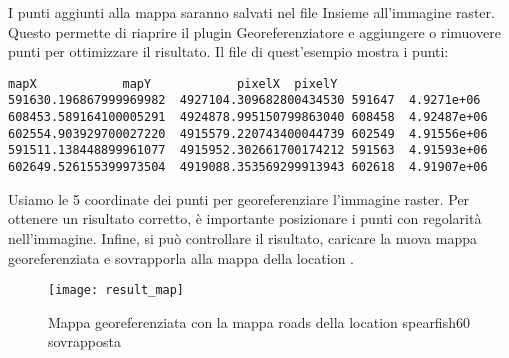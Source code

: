 I punti aggiunti alla mappa saranno salvati nel file  Insieme all'immagine raster. Questo permette di riaprire il plugin Georeferenziatore e aggiungere o rimuovere punti per ottimizzare il risultato. Il file  di quest'esempio mostra i punti:

\begin{verbatim}
mapX    		mapY    		pixelX  pixelY
591630.196867999969982  4927104.309682800434530 591647  4.9271e+06
608453.589164100005291  4924878.995150799863040 608458  4.92487e+06
602554.903929700027220  4915579.220743400044739 602549  4.91556e+06
591511.138448899961077  4915952.302661700174212 591563  4.91593e+06
602649.526155399973504  4919088.353569299913943 602618  4.91907e+06
\end{verbatim} 

Usiamo le 5 coordinate dei punti per georeferenziare l'immagine raster. Per ottenere un risultato corretto, è importante posizionare i punti con regolarità nell'immagine. Infine, si può controllare il risultato, caricare la nuova mappa georeferenziata  e sovrapporla alla mappa  della location .

\begin{figure}[ht]
\begin{center}
  \caption{Mappa georeferenziata con la mappa roads della location spearfish60 sovrapposta
  \nixcaption}\label{fig:result_map}\smallskip
  \texttt{[image: result\_map]}
\end{center}
\end{figure}
